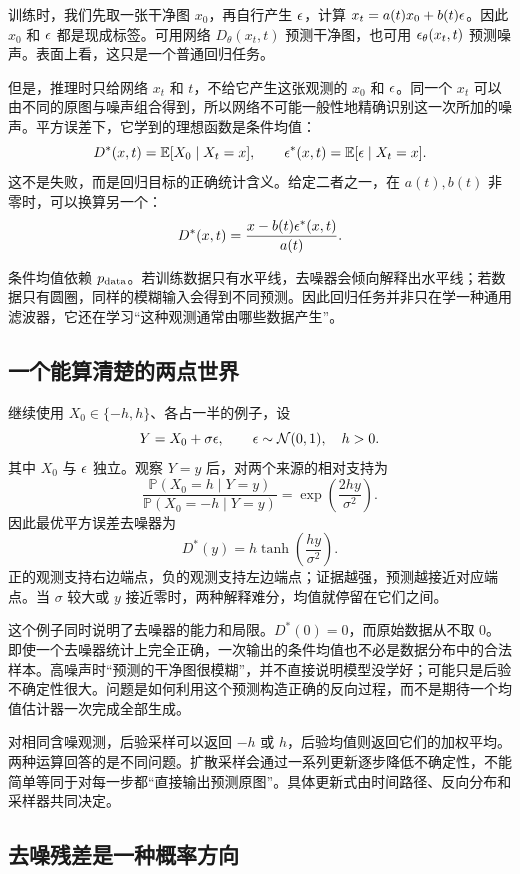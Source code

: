 训练时，我们先取一张干净图 $x_0$，再自行产生 $\epsilon$，计算 $x_t=a(t)x_0+b(t)\epsilon$。因此 $x_0$ 和 $\epsilon$ 都是现成标签。可用网络 $D_\theta(x_t,t)$ 预测干净图，也可用 $\epsilon_\theta(x_t,t)$ 预测噪声。表面上看，这只是一个普通回归任务。

但是，推理时只给网络 $x_t$ 和 $t$，不给它产生这张观测的 $x_0$ 和 $\epsilon$。同一个 $x_t$ 可以由不同的原图与噪声组合得到，所以网络不可能一般性地精确识别这一次所加的噪声。平方误差下，它学到的理想函数是条件均值：
\[
 D^*(x,t)=\mathbb{E}[X_0\mid X_t=x],\qquad
 \epsilon^*(x,t)=\mathbb{E}[\epsilon\mid X_t=x].
\]
这不是失败，而是回归目标的正确统计含义。给定二者之一，在 $a(t),b(t)$ 非零时，可以换算另一个：
\[
 D^*(x,t)=\frac{x-b(t)\epsilon^*(x,t)}{a(t)}.
\]

条件均值依赖 $p_{\mathrm{data}}$。若训练数据只有水平线，去噪器会倾向解释出水平线；若数据只有圆圈，同样的模糊输入会得到不同预测。因此回归任务并非只在学一种通用滤波器，它还在学习“这种观测通常由哪些数据产生”。

\subsection{一个能算清楚的两点世界}

继续使用 $X_0\in\{-h,h\}$、各占一半的例子，设
\[
 Y=X_0+\sigma\epsilon,\qquad \epsilon\sim\mathcal{N}(0,1),\quad h>0.
\]
其中 $X_0$ 与 $\epsilon$ 独立。观察 $Y=y$ 后，对两个来源的相对支持为
\[
 \frac{\mathbb P(X_0=h\mid Y=y)}
      {\mathbb P(X_0=-h\mid Y=y)}
 =\exp\!\left(\frac{2hy}{\sigma^2}\right).
\]
因此最优平方误差去噪器为
\begin{equation}
 D^*(y)=h\tanh\!\left(\frac{hy}{\sigma^2}\right).
 \label{eq:c-two-point-denoiser}
\end{equation}
正的观测支持右边端点，负的观测支持左边端点；证据越强，预测越接近对应端点。当 $\sigma$ 较大或 $y$ 接近零时，两种解释难分，均值就停留在它们之间。

这个例子同时说明了去噪器的能力和局限。$D^*(0)=0$，而原始数据从不取 $0$。即使一个去噪器统计上完全正确，一次输出的条件均值也不必是数据分布中的合法样本。高噪声时“预测的干净图很模糊”，并不直接说明模型没学好；可能只是后验不确定性很大。问题是如何利用这个预测构造正确的反向过程，而不是期待一个均值估计器一次完成全部生成。

对相同含噪观测，后验采样可以返回 $-h$ 或 $h$，后验均值则返回它们的加权平均。两种运算回答的是不同问题。扩散采样会通过一系列更新逐步降低不确定性，不能简单等同于对每一步都“直接输出预测原图”。具体更新式由时间路径、反向分布和采样器共同决定。

\subsection{去噪残差是一种概率方向}

